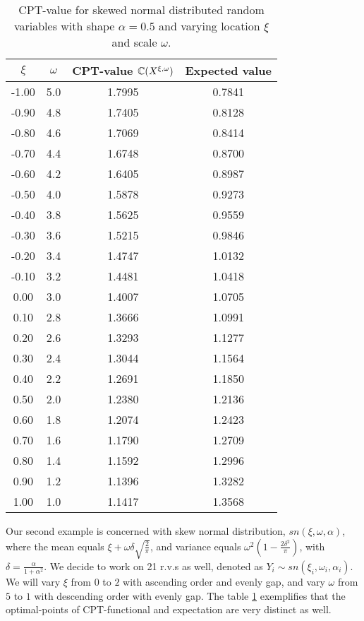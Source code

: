 \begin{table}
\centering
\begin{tabular}{|c|c|c|c|}
\toprule
$\xi$ & $\omega$ & CPT-value $\mathbb{C}(X^{\xi,\omega})$ & Expected value\\
\midrule
-1.00 & 5.0 & 1.7995 & 0.7841\\
-0.90 & 4.8 & 1.7405 & 0.8128\\
-0.80 & 4.6 & 1.7069 & 0.8414\\
-0.70 & 4.4 & 1.6748 & 0.8700\\
-0.60 & 4.2 & 1.6405 & 0.8987\\
-0.50 & 4.0 & 1.5878 & 0.9273\\
-0.40 & 3.8 & 1.5625 & 0.9559\\
-0.30 & 3.6 & 1.5215 & 0.9846\\
-0.20 & 3.4 & 1.4747 & 1.0132\\
-0.10 & 3.2 & 1.4481 & 1.0418\\
0.00 & 3.0 & 1.4007 & 1.0705\\
0.10 & 2.8 & 1.3666 & 1.0991\\
0.20 & 2.6 & 1.3293 & 1.1277\\
0.30 & 2.4 & 1.3044 & 1.1564\\
0.40 & 2.2 & 1.2691 & 1.1850\\
0.50 & 2.0 & 1.2380 & 1.2136\\
0.60 & 1.8 & 1.2074 & 1.2423\\
0.70 & 1.6 & 1.1790 & 1.2709\\
0.80 & 1.4 & 1.1592 & 1.2996\\
0.90 & 1.2 & 1.1396 & 1.3282\\
1.00 & 1.0 & 1.1417 & 1.3568\\
\bottomrule
\end{tabular}
\caption{CPT-value for skewed normal distributed random variables with shape $\alpha=0.5$ and varying location $\xi$ and scale $\omega$.} 
\label{tab:skewNormalCPT}
\end{table}


Our second example is concerned with skew normal distribution, 
$sn(\xi, \omega, \alpha)$, where the mean equals 
$\xi + \omega \delta \sqrt{\frac{2}{\pi}}$, and variance equals 
$\omega^2(1 - \frac{2\delta^2}{\pi})$, with $\delta = \frac{\alpha}{1 + \alpha^2}$.
We decide to work on 21 r.v.s as well, denoted as $Y_i \sim sn(\xi_i, \omega_i, \alpha_i)$.
We will vary $\xi$ from $0$ to $2$ with ascending order and evenly gap, and vary $\omega$ from $5$ to $1$ with descending order with evenly gap. 
The table \ref{tab:skewNormalCPT} exemplifies that the optimal-points of CPT-functional and expectation are very distinct as well. 

